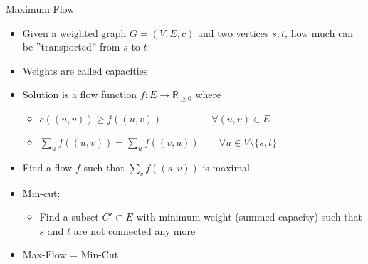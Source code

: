 \documentclass[12pt,t]{beamer}
\newcommand{\bi}{\begin{itemize}}
\newcommand{\ei}{\end{itemize}}
\begin{document}
\begin{frame}{Maximum Flow}
    \bi
\item Given a weighted graph $G = (V,E,c)$ and two vertices $s,t$, how much can be ''transported'' from $s$ to $t$
\item Weights are called capacities
\item Solution is a flow function $f : E \rightarrow \mathbb R_{\geq 0}$ where
  \bi
    \item $c((u,v)) \geq f((u,v)) \quad \quad\quad\quad \quad \forall (u,v) \in E$
    \item $\sum_uf((u,v)) = \sum_uf((v,u)) \quad \quad \forall u \in V \setminus\{s,t\}$
  \ei
  \item Find a flow $f$ such that $\sum_v f((s,v))$ is maximal
  \vspace{10pt} \pause
  \item Min-cut:
  \bi
    \item Find a subset $C'\subset E$ with minimum weight (summed capacity) such that $s$ and $t$ are not connected any more
  \ei
  \vspace{10pt} \pause
  \item Max-Flow = Min-Cut
    \ei
\end{frame}
\end{document}

